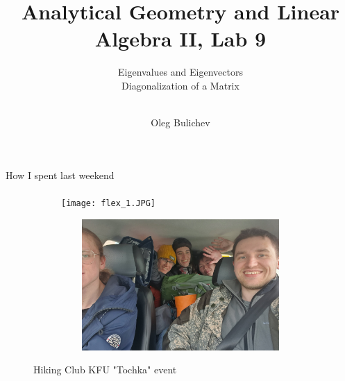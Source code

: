 \documentclass[aspectratio=169]{beamer}
\title[AGLA2]{Analytical Geometry and Linear Algebra II, Lab 9} %
\subtitle{Eigenvalues and Eigenvectors \\ Diagonalization of a Matrix \\ \ 
         } %
\author{Oleg Bulichev}
\newcommand{\fbckg}[1]{\usebackgroundtemplate{\texttt{[image: \#1]}}}%
\begin{document}
\setlength{\abovedisplayskip}{0pt}
\setlength{\belowdisplayskip}{0pt}
\setlength{\abovedisplayshortskip}{0pt}
\setlength{\belowdisplayshortskip}{0pt}

\fbckg{fibeamer/figs/title_page.png}

\fbckg{fibeamer/figs/common.png}

\begin{frame}[c]{How I spent last weekend}
    \framesubtitle{}
    \begin{figure}[H]
        \begin{subfigure}{0.49\textwidth}
            \centering\texttt{[image: flex\_1.JPG]}
        \end{subfigure}
        \hfill
        \begin{subfigure}{0.49\textwidth}
            \centering\includegraphics[height=5cm,width=1\textwidth,keepaspectratio]{flex_2.JPG}
        \end{subfigure}
        \caption*{\Large Hiking Club KFU "Tochka" event }
    \end{figure}
\end{frame}
\end{document}
